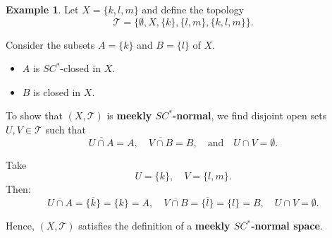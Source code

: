 \documentclass[12pt,a4paper,twoside]{report}  %
\theoremstyle{plain}
\theoremstyle{definition}
\newtheorem{example}[theorem]{Example}
\begin{document}
\begin{example}
Let $X = \{k, l, m\}$ and define the topology
\[
\mathcal{T} = \{\emptyset, X, \{k\}, \{l, m\}, \{k, l, m\}\}.
\]

Consider the subsets $A = \{k\}$ and $B = \{l\}$ of $X$.  

\begin{itemize}
    \item $A$ is $SC^*$-closed in $X$.
    \item $B$ is closed in $X$.
\end{itemize}

To show that $(X, \mathcal{T})$ is \textbf{meekly $SC^*$-normal}, we find disjoint open sets $U, V \in \mathcal{T}$ such that
\[
\overline{U \cap A} = A, \quad \overline{V \cap B} = B, \quad \text{and} \quad U \cap V = \emptyset.
\]

Take
\[
U = \{k\}, \quad V = \{l, m\}.
\] 
Then:
\[
\overline{U \cap A} = \overline{\{k\}} = \{k\} = A, \quad
\overline{V \cap B} = \overline{\{l\}} = \{l\} = B, \quad
U \cap V = \emptyset.
\]

Hence, $(X, \mathcal{T})$ satisfies the definition of a \textbf{meekly $SC^*$-normal space}.
\end{example}
\end{document}
